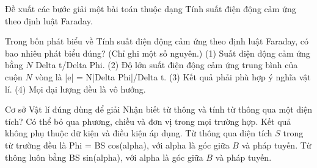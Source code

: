\begin{bt}
Đề xuất các bước giải một bài toán thuộc dạng Tính suất điện động cảm ứng theo định luật Faraday.
\end{bt}

\begin{ex}
Trong bốn phát biểu về Tính suất điện động cảm ứng theo định luật Faraday, có bao nhiêu phát biểu đúng? (Chỉ ghi một số nguyên.) (1) Suất điện động cảm ứng bằng $N$ Delta t/Delta Phi. (2) Độ lớn suất điện động cảm ứng trung bình của cuộn $N$ vòng là |e| = N|Delta Phi|/Delta t. (3) Kết quả phải phù hợp ý nghĩa vật lí. (4) Mọi đại lượng đều là vô hướng.
\end{ex}

\begin{ex}
Cơ sở Vật lí đúng dùng để giải Nhận biết từ thông và tính từ thông qua một diện tích?
\choice
{Có thể bỏ qua phương, chiều và đơn vị trong mọi trường hợp.}
{Kết quả không phụ thuộc dữ kiện và điều kiện áp dụng.}
{\True Từ thông qua diện tích $S$ trong từ trường đều là Phi = BS cos(alpha), với alpha là góc giữa $B$ và pháp tuyến.}
{Từ thông luôn bằng BS sin(alpha), với alpha là góc giữa $B$ và pháp tuyến.}
\end{ex}

